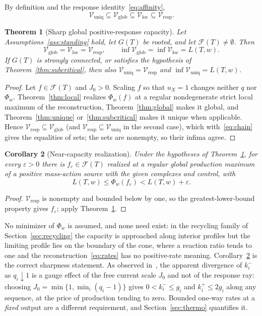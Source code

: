 \documentclass[11pt,a4paper]{article}
\theoremstyle{plain}
\newtheorem{theorem}{Theorem}[section]
\newtheorem{corollary}[theorem]{Corollary}
\theoremstyle{definition}
\theoremstyle{remark}
\numberwithin{equation}{section}
\newcommand{\cone}{\mathcal{F}}
\newcommand{\Vresp}{\mathcal{V}_{\mathrm{resp}}}
\newcommand{\Vloc}{\mathcal{V}_{\mathrm{loc}}}
\newcommand{\Vglob}{\mathcal{V}_{\mathrm{glob}}}
\newcommand{\Vuniq}{\mathcal{V}_{\mathrm{uniq}}}
\newcommand{\eps}{\varepsilon}
\begin{document}
By definition and the response identity~\eqref{eq:affinity},
\begin{equation}\label{eq:chain}
 \Vuniq\subseteq\Vglob\subseteq\Vloc\subseteq\Vresp .
\end{equation}

\begin{theorem}[Sharp global positive-response capacity]\label{thm:capacity}
Let Assumptions~\ref{ass:standing} hold, let $G(T)$ be rooted, and let $\cone(T)\ne\emptyset$. Then
\begin{equation}\label{eq:valueeq}
 \Vglob=\Vloc=\Vresp,\qquad \inf\Vglob=\inf\Vloc=L(T,w).
\end{equation}
If $G(T)$ is strongly connected, or satisfies the hypothesis of Theorem~\ref{thm:subcritical}, then also $\Vuniq=\Vresp$ and $\inf\Vuniq=L(T,w)$.
\end{theorem}
\begin{proof}
Let $f\in\cone(T)$ and $J_0>0$. Scaling $f$ so that $u_X=1$ changes neither $q$ nor $\Phi_w$. Theorem~\ref{thm:local} realizes $\Phi_w(f)$ at a regular nondegenerate strict local maximum of the reconstruction, Theorem~\ref{thm:global} makes it global, and Theorem~\ref{thm:unique} or~\ref{thm:subcritical} makes it unique when applicable. Hence $\Vresp\subseteq\Vglob$ (and $\Vresp\subseteq\Vuniq$ in the second case), which with~\eqref{eq:chain} gives the equalities of sets; the sets are nonempty, so their infima agree.
\end{proof}

\begin{corollary}[Near-capacity realization]\label{cor:near}
Under the hypotheses of Theorem~\ref{thm:capacity}, for every $\eps>0$ there is $f_\eps\in\cone(T)$ realized at a regular global production maximum of a positive mass-action source with the given complexes and control, with
\begin{equation}\label{eq:epsilon}
 L(T,w)\le\Phi_w(f_\eps)<L(T,w)+\eps .
\end{equation}
\end{corollary}
\begin{proof}
$\Vresp$ is nonempty and bounded below by one, so the greatest-lower-bound property gives $f_\eps$; apply Theorem~\ref{thm:capacity}.
\end{proof}

No minimizer of $\Phi_w$ is assumed, and none need exist: in the recycling family of Section~\ref{sec:recycling} the capacity is approached along interior profiles but the limiting profile lies on the boundary of the cone, where a reaction ratio tends to one and the reconstruction~\eqref{eq:rates} has no positive-rate meaning. Corollary~\ref{cor:near} is the correct sharpness statement. As observed in~\citep[Remark~5.19]{companion2026}, the apparent divergence of $k^-_i$ as $q_i\downarrow1$ is a gauge effect of the free current scale $J_0$ and not of the response ray: choosing $J_0=\min\{1,\min_i(q_i-1)\}$ gives $0<k^-_i\le g_i$ and $k^+_i\le2g_i$ along any sequence, at the price of production tending to zero. Bounded one-way rates at a \emph{fixed} output are a different requirement, and Section~\ref{sec:thermo} quantifies it.
\end{document}

